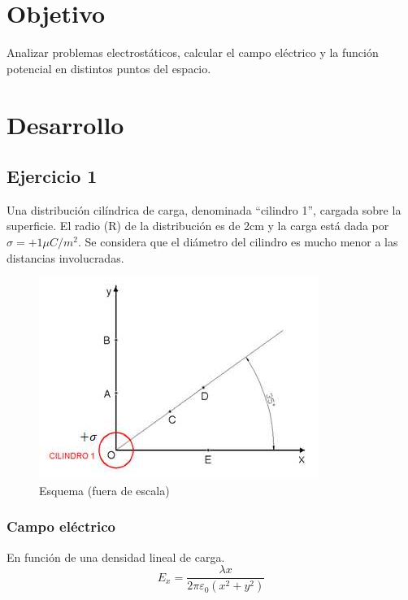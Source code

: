 \documentclass{article}
\begin{document}
\section{Objetivo}
Analizar problemas electrostáticos, calcular el campo eléctrico y la función potencial en distintos puntos del espacio.

\section{Desarrollo}
\subsection{Ejercicio 1}
Una distribución cilíndrica de carga, denominada “cilindro 1”, cargada sobre la superficie. El radio (R) de la distribución es de 2cm y la carga está dada por $ \sigma = +1 \mu C/m^2 $.
Se considera que el diámetro del cilindro es mucho menor a las distancias involucradas.

\begin{figure}[H]
\centering
\includegraphics[scale=1]{1.png}
\caption{Esquema (fuera de escala)}
\label{fig:1}
\end{figure}

\subsubsection{Campo eléctrico}

En función de una densidad lineal de carga.
	\begin{equation}
		E_x = \frac{\lambda x}{2 \pi \varepsilon_0 (x^2 + y^2)}
	\end{equation}
\end{document}
